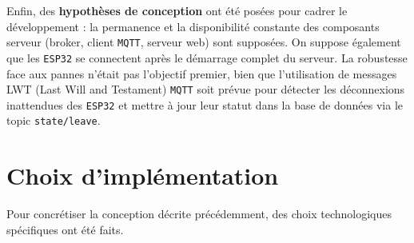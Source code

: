 \documentclass[12pt]{article}
\begin{document}
Enfin, des \textbf{hypothèses de conception} ont été posées pour cadrer le développement : la permanence et la disponibilité constante des composants serveur (broker, client \texttt{MQTT}, serveur web) sont supposées. On suppose également que les \texttt{ESP32} se connectent après le démarrage complet du serveur. La robustesse face aux pannes n'était pas l'objectif premier, bien que l'utilisation de messages LWT (Last Will and Testament) \texttt{MQTT} soit prévue pour détecter les déconnexions inattendues des \texttt{ESP32} et mettre à jour leur statut dans la base de données via le topic \texttt{state/leave}.

\section{Choix d'implémentation}

Pour concrétiser la conception décrite précédemment, des choix technologiques spécifiques ont été faits.
\end{document}
